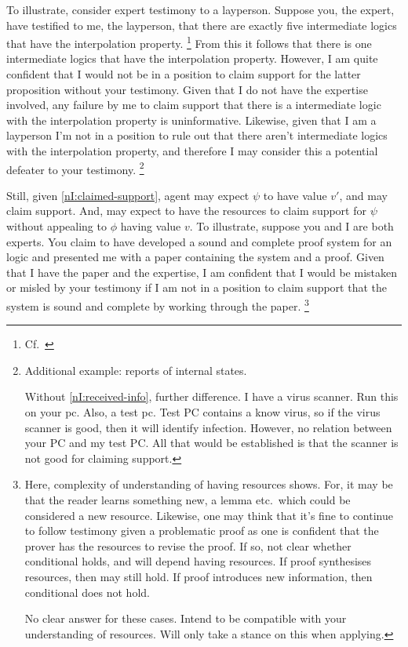 \begin{note}
  To illustrate, consider expert testimony to a layperson.
  Suppose you, the expert, have testified to me, the layperson, that there are exactly five intermediate logics that have the interpolation property.\nolinebreak
  \footnote{Cf.\ \textcite{Maksimova:1977un}}
  From this it follows that there is one intermediate logics that have the interpolation property.
  However, I am quite confident that I would not be in a position to claim support for the latter proposition without your testimony.
  Given that I do not have the expertise involved, any failure by me to claim support that there is a intermediate logic with the interpolation property is uninformative.
  Likewise, given that I am a layperson I'm not in a position to rule out that there aren't intermediate logics with the interpolation property, and therefore I may consider this a potential defeater to your testimony.\nolinebreak
  \footnote{
    Additional example: reports of internal states.

    Without \ref{nI:received-info}, further difference.
    I have a virus scanner.
    Run this on your pc.
    Also, a test pc.
    Test PC contains a know virus, so if the virus scanner is good, then it will identify infection.
    However, no relation between your PC and my test PC.
    All that would be established is that the scanner is not good for claiming support.
    }

  Still, given \ref{nI:claimed-support}, agent may expect \(\psi\) to have value \(v'\), and may claim support.
  And, may expect to have the resources to claim support for \(\psi\) without appealing to \(\phi\) having value \(v\).
  To illustrate, suppose you and I are both experts.
  You claim to have developed a sound and complete proof system for an logic and presented me with a paper containing the system and a proof.
  Given that I have the paper and the expertise, I am confident that I would be mistaken or misled by your testimony if I am not in a position to claim support that the system is sound and complete by working through the paper.\nolinebreak
  \footnote{
    Here, complexity of understanding of having resources shows.
    For, it may be that the reader learns something new, a lemma etc.\ which could be considered a new resource.
    Likewise, one may think that it's fine to continue to follow testimony given a problematic proof as one is confident that the prover has the resources to revise the proof.
    If so, not clear whether conditional holds, and will depend having resources.
    If proof synthesises resources, then may still hold.
    If proof introduces new information, then conditional does not hold.

    No clear answer for these cases.
    Intend to be compatible with your understanding of resources.
    Will only take a stance on this when applying.
  }
\end{note}


